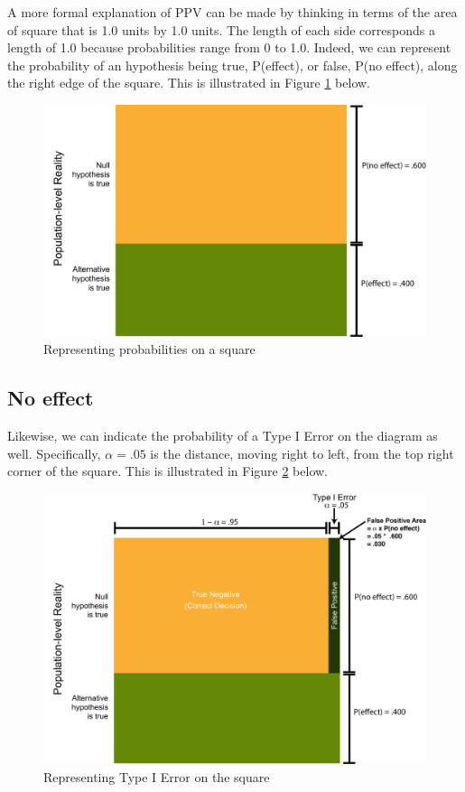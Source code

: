 \documentclass[
]{krantz}
\begin{document}
A more formal explanation of PPV can be made by thinking in terms of the area of square that is 1.0 units by 1.0 units. The length of each side corresponds a length of 1.0 because probabilities range from 0 to 1.0. Indeed, we can represent the probability of an hypothesis being true, P(effect), or false, P(no effect), along the right edge of the square. This is illustrated in Figure \ref{fig:ppvfig6} below.

\begin{figure}
\includegraphics[width=0.9\linewidth]{ch_ppv/images/fig6} \caption{Representing probabilities on a square}\label{fig:ppvfig6}
\end{figure}

\hypertarget{no-effect}{%
\subsection{No effect}\label{no-effect}}

Likewise, we can indicate the probability of a Type I Error on the diagram as well. Specifically, \(\alpha = .05\) is the distance, moving right to left, from the top right corner of the square. This is illustrated in Figure \ref{fig:ppvfig7} below.

\begin{figure}
\includegraphics[width=0.9\linewidth]{ch_ppv/images/fig7} \caption{Representing Type I Error on the square}\label{fig:ppvfig7}
\end{figure}
\end{document}
